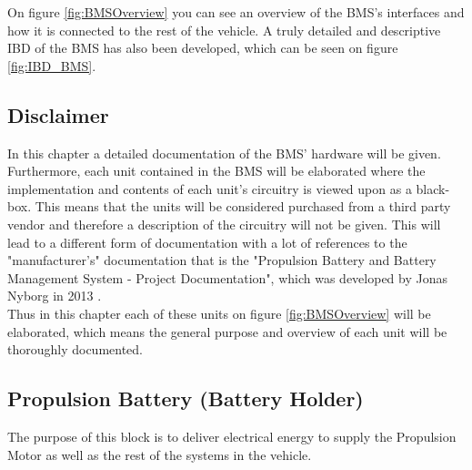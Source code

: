 On figure \vref{fig:BMSOverview} you can see an overview of the BMS's interfaces and how it is connected to the rest of the vehicle. A truly detailed and descriptive IBD of the BMS has also been developed, which can be seen on figure \vref{fig:IBD_BMS}.

\subsection{Disclaimer}
In this chapter a detailed documentation of the BMS' hardware will be given. Furthermore, each unit contained in the BMS will be elaborated where the implementation and contents of each unit's circuitry is viewed upon as a black-box. This means that the units will be considered purchased from a third party vendor and therefore a  description of the circuitry will not be given. This will lead to a different form of documentation with a lot of references to the "manufacturer's" documentation that is the "Propulsion Battery and Battery Management System - Project Documentation", which was developed by Jonas Nyborg in 2013 \cite{BMSDocumentation}.\\
Thus in this chapter each of these units on figure \vref{fig:BMSOverview} will be elaborated, which means the general purpose and overview of each unit will be thoroughly documented. 

\subsection{Propulsion Battery (Battery Holder)}
\label{sec:BMSBattery}
The purpose of this block is to deliver electrical energy to supply the Propulsion Motor as well as the rest of the systems in the vehicle.

